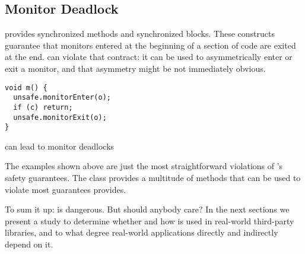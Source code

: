 \subsection*{Monitor Deadlock}

\java{} provides synchronized methods and synchronized blocks.
These constructs guarantee that monitors entered at the beginning
of a section of code are exited at the end.
\unsafe{} can violate that contract:
it can be used to asymmetrically enter or exit a monitor,
and that asymmetry might be not immediately obvious.

\begin{listing}
\begin{verbatim}
void m() {
  unsafe.monitorEnter(o);
  if (c) return;
  unsafe.monitorExit(o);
}
\end{verbatim}
\caption{\smu{} can lead to monitor deadlocks}
\end{listing}

The examples shown above are just the most straightforward violations of
\java{}'s safety guarantees.
The \smu{} class provides a multitude of methods that can be used
to violate most guarantees \java{} provides.

To sum it up: \unsafe{} is dangerous.
But should anybody care?
In the next sections we present a study to determine whether and how
\unsafe{} is used in real-world third-party \java{} libraries,
and to what degree real-world applications directly and indirectly
depend on it.